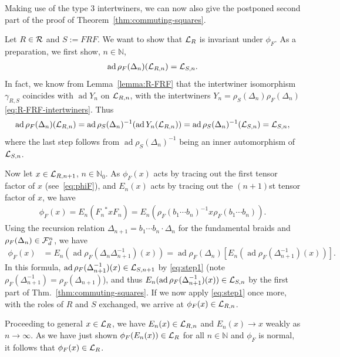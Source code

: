 \documentclass[12pt,a4paper]{amsart}
\numberwithin{equation}{section}
\theoremstyle{remark}
\DeclareMathOperator{\ad}{ad}
\newcommand{\Nl}{\mathbb{N}}
\begin{document}
\medskip

Making use of the type 3 intertwiners, we can now also give the postponed second part of the proof of Theorem~\ref{thm:commuting-squares}.

\medskip

 \label{page:proofpart2}
	Let $R\in\mathcal{R}$ and $S:=FRF$. We want to show that $\mathcal{L}_R$ is invariant under $\phi_F$. As a preparation, we first show, $n\in\Nl$,
	\begin{align}\label{eq:step1}
		\ad\rho_F(\Delta_{n})(\CL_{R,n})
		=
		\CL_{S,n}.
	\end{align}
	In fact, we know from Lemma~\ref{lemma:R-FRF} that the intertwiner isomorphism $\gamma_{R,S}$ coincides with $\ad Y_n$ on $\mathcal{L}_{R,n}$, with the intertwiners $Y_n=\rho_{S}(\Delta_n)\rho_F(\Delta_n)$ \eqref{eq:R-FRF-intertwiners}. Thus
	\begin{align*}
		\ad\rho_F(\Delta_n)(\CL_{R,n})
		=
		\ad\rho_S(\Delta_n)^{-1}(\ad Y_n(\CL_{R,n}))
		=
		\ad\rho_S(\Delta_n)^{-1}(\CL_{S,n})
		=
		\CL_{S,n},
	\end{align*}
	where the last step follows from $\ad\rho_S(\Delta_n)^{-1}$ being an inner automorphism of~$\mathcal{L}_{S,n}$.

	Now let $x\in\mathcal{L}_{R,n+1}$, $n\in\Nl_0$. As $\phi_F(x)$ acts by tracing out the first tensor factor of $x$ (see~\eqref{eq:phiF}), and $E_n(x)$ acts by tracing out the $(n+1)$st tensor factor of $x$, we have
	\begin{align}
		\phi_F(x)
		=
		E_n({F_n}^*xF_n)
		=
		E_n(\rho_F(b_1\cdots b_n)^{-1}x\rho_F(b_1\cdots b_n)).
	\end{align}
	Using the recursion relation $\Delta_{n+1}=b_1\cdots b_n\cdot \Delta_n$ for the fundamental braids and $\rho_F(\Delta_n)\in\mathcal{F}_d^n$, we have
	\begin{align*}
		\phi_F(x)
		&=
		E_n(\ad\rho_F(\Delta_n\Delta_{n+1}^{-1})(x))
		=
		\ad\rho_F(\Delta_n)\left[E_n(\ad\rho_F(\Delta_{n+1}^{-1})(x))\right].
	\end{align*}
	In this formula, $\ad\rho_F(\Delta_{n+1}^{-1})(x)\in\CL_{S,n+1}$ by \eqref{eq:step1} (note $\rho_F(\Delta_{n+1}^{-1})=\rho_F(\Delta_{n+1})$), and thus $E_n(\ad\rho_F(\Delta_{n+1}^{-1})(x))\in\CL_{S,n}$ by the first part of Thm.~\ref{thm:commuting-squares}. If we now apply \eqref{eq:step1} once more, with the roles of $R$ and $S$ exchanged, we arrive at $\phi_F(x)\in\mathcal{L}_{R,n}$.

	Proceeding to general $x\in\mathcal{L}_R$, we have $E_n(x)\in\mathcal{L}_{R,n}$ and $E_n(x)\to x$ weakly as $n\to\infty$. As we have just shown $\phi_F(E_n(x))\in\mathcal{L}_R$ for all $n\in\Nl$ and $\phi_F$ is normal, it follows that $\phi_F(x)\in\mathcal{L}_R$.
\end{document}
